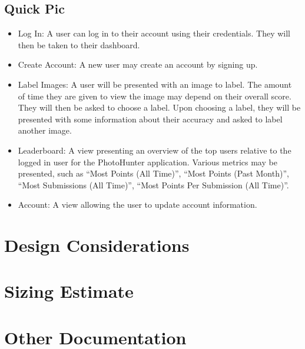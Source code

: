 \documentclass{article}
\begin{document}
\subsection{Quick Pic}

\begin{itemize}
\item Log In: A user can log in to their account using their credentials. They will then be taken to their dashboard.
\item Create Account: A new user may create an account by signing up.
\end{itemize}

\begin{itemize}
\item Label Images: A user will be presented with an image to label.  The
  amount of time they are given to view the image may depend on their overall
  score.  They will then be asked to choose a label.  Upon choosing a label,
  they will be presented with some information about their accuracy and asked
  to label another image.
\item Leaderboard: A view presenting an overview of the top users relative to
  the logged in user for the PhotoHunter application.  Various metrics may be
  presented, such as ``Most Points (All Time)'', ``Most Points (Past Month)'',
  ``Most Submissions (All Time)'', ``Most Points Per Submission (All Time)''.

\item Account: A view allowing the user to update account information.
\end{itemize}
\section{Design Considerations}

\section{Sizing Estimate}

\section{Other Documentation}
\end{document}
